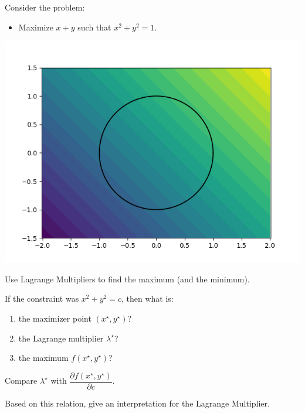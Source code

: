 \documentclass{workbook}
\begin{document}
\begin{slide}
	
\begin{problem}[Example]
Consider the problem:
\begin{itemize}
	\item Maximize $x+y$ \quad such that $x^2+y^2 = 1$.
\end{itemize}
\end{problem}

\begin{center}
	\includegraphics[width=.4\textwidth]{images/LagrangeMultipliers-ex.png}
\end{center}

\begin{parts}
	\item Use Lagrange Multipliers to find the maximum (and the minimum).

	\item If the constraint was $x^2+y^2=c$, then what is:
	\begin{enumerate}
		\item the maximizer point $(x^\star,y^\star)$?
		\item the Lagrange multiplier $\lambda^\star$?
		\item the maximum $f(x^\star,y^\star)$?
	\end{enumerate}
	
	\item Compare $\lambda^\star$ with $\dfrac{\partial f(x^\star,y^\star)}{\partial c}$.
	

	\item Based on this relation, give an interpretation for the Lagrange Multiplier.
	
\end{parts}

\end{slide}
\end{document}
